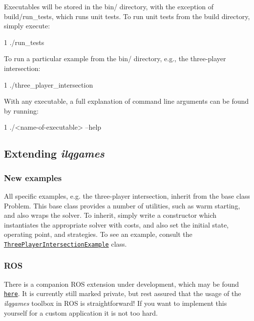 Executables will be stored in the {\ttfamily bin/} directory, with the exception of {\ttfamily build/run\+\_\+tests}, which runs unit tests. To run unit tests from the build directory, simply execute\+: 
\begin{DoxyCode}
1 ./run\_tests
\end{DoxyCode}


To run a particular example from the {\ttfamily bin/} directory, e.\+g., the three-\/player intersection\+: 
\begin{DoxyCode}
1 ./three\_player\_intersection
\end{DoxyCode}


With any executable, a full explanation of command line arguments can be found by running\+: 
\begin{DoxyCode}
1 ./<name-of-executable> --help
\end{DoxyCode}


\subsection*{Extending {\itshape ilqgames}}

\subsubsection*{New examples}

All specific examples, e.\+g. the three-\/player intersection, inherit from the base class {\ttfamily Problem}. This base class provides a number of utilities, such as warm starting, and also wraps the solver. To inherit, simply write a constructor which instantiates the appropriate solver with costs, and also set the initial state, operating point, and strategies. To see an example, consult the \href{https://github.com/HJReachability/ilqgames/blob/master/src/three_player_intersection_example.cpp}{\tt Three\+Player\+Intersection\+Example} class.

\subsubsection*{R\+OS}

There is a companion R\+OS extension under development, which may be found \href{https://github.com/HJReachability/ilqgames_ros}{\tt here}. It is currently still marked private, but rest assured that the usage of the {\itshape ilqgames} toolbox in R\+OS is straightforward! If you want to implement this yourself for a custom application it is not too hard.


